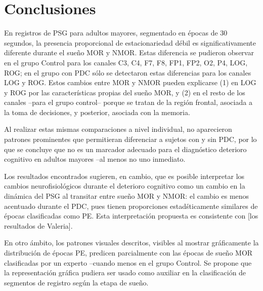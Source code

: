 \documentclass[12pt,a4paper]{mitthesis}
\begin{document}

\section{Conclusiones}

En registros de PSG para adultos mayores, segmentado en \'epocas de 30 segundos, la presencia 
proporcional de estacionariedad d\'ebil es significativamente diferente durante el sue\~no MOR y NMOR.
Estas diferencia se pudieron observar en el grupo Control para los canales C3, C4, F7, F8, FP1, 
FP2, O2, P4, LOG, ROG; en el grupo con PDC s\'olo se detectaron estas diferencias para los canales 
LOG y ROG.
Estos cambios entre MOR y NMOR pueden explicarse (1) en LOG y ROG por las caracter\'isticas propias 
del sue\~no MOR, y (2) en el resto de los canales --para el grupo control-- porque se tratan de la 
regi\'on frontal, asociada a la toma de decisiones, y posterior, asociada con la memoria.


Al realizar estas mismas comparaciones a nivel individual, no aparecieron patrones prominentes que 
permitieran diferenciar a sujetos con y sin PDC, por lo que se concluye que no es un marcador 
adecuado para el diagn\'ostico deterioro cognitivo en adultos mayores --al menos no uno inmediato.

Los resultados encontrados sugieren, en cambio, que es posible interpretar los cambios 
neurofisiol\'ogicos durante el deterioro cognitivo como un cambio en la din\'amica del PSG al 
transitar entre sue\~no MOR y NMOR: el cambio es menos acentuado durante el PDC, pues tienen 
proporciones estad\'sticamente similares de \'epocas clasificadas como PE.
Esta interpretaci\'on propuesta es consistente con [los resultados de Valeria].

En otro \'ambito, los patrones visuales descritos, visibles al mostrar gr\'aficamente la 
distribuci\'on de \'epocas PE, predicen parcialmente con las \'epocas de sue\~no MOR clasificadas 
por un experto --cuando menos en el grupo Control.
Se propone que la representaci\'on gr\'afica pudiera ser usado como auxiliar en la clasificaci\'on 
de segmentos de registro seg\'un la etapa de sue\~no.
\end{document}
